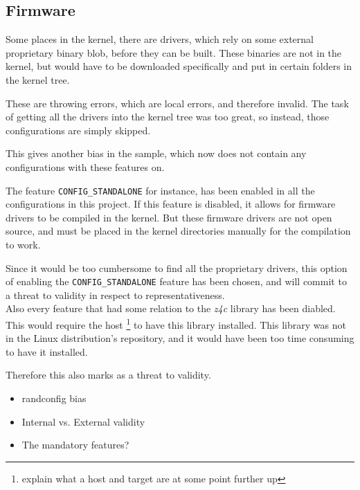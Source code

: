 \documentclass[a4paper,11pt]{report}
\newcommand{\textcode}[1]{
    \fboxsep=1pt
    \texttt{\colorbox{gray!20}{#1}}
}
\begin{document}
\subsection{Firmware}

Some places in the kernel, there are drivers, which rely on some external 
proprietary binary blob, before they can be built. These binaries are not in 
the kernel, but would have to be downloaded specifically and put in certain 
folders in the kernel tree.

These are throwing errors, which are local errors, and therefore invalid. The 
task of getting all the drivers into the kernel tree was too great, so instead, 
those configurations are simply skipped.

This gives another bias in the sample, which now does not contain any 
configurations with these features on.


The feature \textcode{CONFIG\_STANDALONE} for instance, has been enabled in all 
the configurations in this project. If this feature is disabled, it allows for 
firmware drivers to be compiled in the kernel. But these firmware drivers are 
not open source, and must be placed in the kernel directories manually for the 
compilation to work.

Since it would be too cumbersome to find all the proprietary drivers, this 
option of enabling the \textcode{CONFIG\_STANDALONE} feature has been chosen, 
and will commit to a threat to validity in respect to representativeness.
\\

Also every feature that had some relation to the \emph{z4c} library has been 
diabled. This would require the host \footnote{explain what a host and target 
are at some point further up} to have this library installed. This library was 
not in the Linux distribution's repository, and it would have been too time 
consuming to have it installed. 

Therefore this also marks as a threat to validity.

\begin{itemize}
    \item randconfig bias
    \item Internal vs. External validity
    \item The mandatory features?
\end{itemize}
\end{document}
